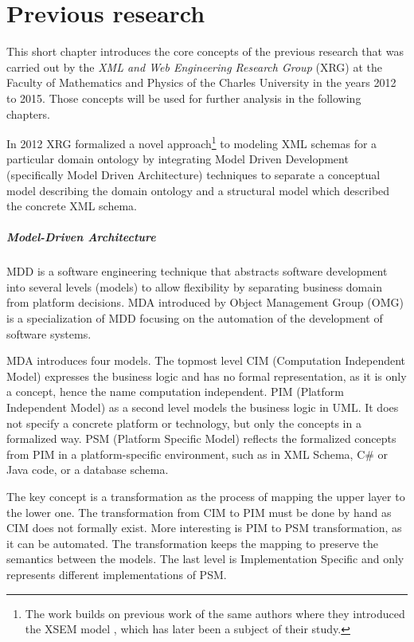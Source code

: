 \chapter{Previous research}
\label{chapters:previous-research}

This short chapter introduces the core concepts of the previous research that was carried out by the \textit{XML and Web Engineering Research Group} (XRG) at the Faculty of Mathematics and Physics of the Charles University in the years 2012 to 2015. Those concepts will be used for further analysis in the following chapters.

\bigskip

In 2012 XRG formalized a novel approach\footnote{The work builds on previous work of the same authors where they introduced the XSEM model \cite{necasky2007xsem}, which has later been a subject of their study.} to modeling XML schemas \cite{necasky2012conceptual} for a particular domain ontology by integrating Model Driven Development \cite{kent2002model} (specifically Model Driven Architecture) techniques to separate a conceptual mo\-del describing the domain ontology and a structural model which described the concrete XML schema.

\paragraph{Model-Driven Architecture} MDD is a software engineering technique that abstracts software development into several levels (models) to allow flexibility by separating business domain from platform decisions. MDA \cite{mda,mda_developing_in} introduced by Object Management Group (OMG) is a specialization of MDD focusing on the automation of the development of software systems.

MDA introduces four models. The topmost level CIM (Computation Independent Model) expresses the business logic and has no formal representation, as it is only a concept, hence the name computation independent. PIM (Platform Independent Model) as a second level models the business logic in UML. It does not specify a concrete platform or technology, but only the concepts in a formalized way. PSM (Platform Specific Model) reflects the formalized concepts from PIM in a platform-specific environment, such as in XML Schema, C\# or Java code, or a database schema.

The key concept is a transformation as the process of mapping the upper layer to the lower one. The transformation from CIM to PIM must be done by hand as CIM does not formally exist. More interesting is PIM to PSM transformation, as it can be automated. The transformation keeps the mapping to preserve the semantics between the models. The last level is Implementation Specific and only represents different implementations of PSM.

